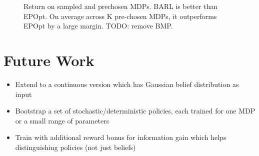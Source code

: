 \documentclass{article}
\begin{document}
\begin{figure}[t!]
\begin{centering}
\begin{subfigure}[b]{0.22\columnwidth}
\end{subfigure}
\end{centering}
\caption{Return on sampled and prechosen MDPs. BARL is better than EPOpt. On average across K pre-chosen MDPs, it outperforms EPOpt by a large margin. TODO: remove BMP.}
\end{figure}



\section{Future Work}

\begin{itemize}
    \item Extend to a continuous version which has Gaussian belief distribution as input
    \item Bootstrap a set of stochastic/deterministic policies, each trained for one MDP or a small range of parameters
    \item Train with additional reward bonus for information gain which helps distinguishing policies (not just beliefs)
\end{itemize}
\end{document}
